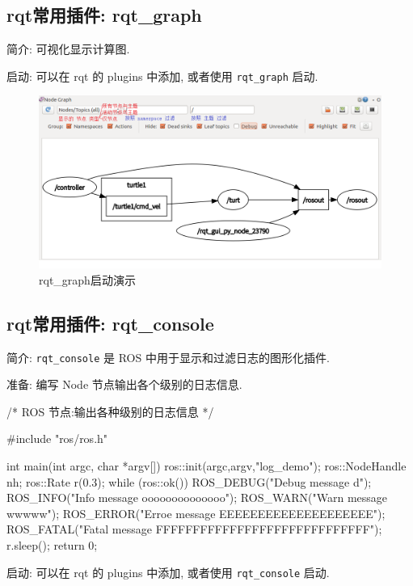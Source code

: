 \documentclass[openany, fontset=windowsold]{ctexbook}
\theoremstyle{kaiti}
\theoremstyle{normal}
\begin{document}
\subsection{rqt常用插件: rqt\_graph}

简介: 可视化显示计算图.

启动: 可以在 rqt 的 plugins 中添加, 或者使用 \verb|rqt_graph| 启动.

\begin{figure}[!ht]
  \centering
  \includegraphics[width=.9\textwidth]{ros_rqt_graph.png}
  \caption{rqt\_graph启动演示}
  \label{fig:ros_rqt_graph}
\end{figure}

\subsection{rqt常用插件: rqt\_console}

简介: \verb|rqt_console| 是 ROS 中用于显示和过滤日志的图形化插件.

准备: 编写 Node 节点输出各个级别的日志信息.

\begin{cpp}
  /*  
      ROS 节点:输出各种级别的日志信息
  */

  #include "ros/ros.h"

  int main(int argc, char *argv[])
  {
      ros::init(argc,argv,"log_demo");
      ros::NodeHandle nh;
      ros::Rate r(0.3);
      while (ros::ok())
      {
          ROS_DEBUG("Debug message d");
          ROS_INFO("Info message oooooooooooooo");
          ROS_WARN("Warn message wwwww");
          ROS_ERROR("Erroe message EEEEEEEEEEEEEEEEEEEE");
          ROS_FATAL("Fatal message FFFFFFFFFFFFFFFFFFFFFFFFFFFFF");
          r.sleep();
      }
      return 0;
  }
\end{cpp}

启动: 可以在 rqt 的 plugins 中添加, 或者使用 \verb|rqt_console| 启动.
\end{document}
